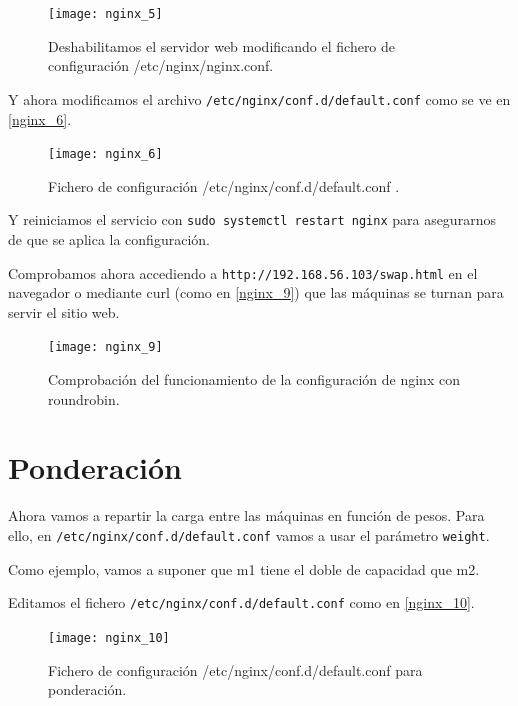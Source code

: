 \begin{figure}[h!]
\begin{center}
\caption{Deshabilitamos el servidor web modificando el fichero de configuración /etc/nginx/nginx.conf.}
\label{nginx_5}
\texttt{[image: nginx\_5]}
\end{center}
\end{figure}

Y ahora modificamos el archivo \verb|/etc/nginx/conf.d/default.conf| como se ve en \eqref{nginx_6}.

\begin{figure}[h!]
\begin{center}
\caption{Fichero de configuración /etc/nginx/conf.d/default.conf .}
\label{nginx_6}
\texttt{[image: nginx\_6]}
\end{center}
\end{figure}

Y reiniciamos el servicio con \verb|sudo systemctl restart nginx| para asegurarnos de que se aplica la configuración.

Comprobamos ahora accediendo a \verb|http://192.168.56.103/swap.html| en el navegador o mediante curl (como en \eqref{nginx_9}) que las máquinas se turnan para servir el sitio web.

\begin{figure}[h!]
\begin{center}
\caption{Comprobación del funcionamiento de la configuración de nginx con roundrobin.}
\label{nginx_9}
\texttt{[image: nginx\_9]}
\end{center}
\end{figure}

\section{Ponderación}

Ahora vamos a repartir la carga entre las máquinas en función de pesos. Para ello, en \verb|/etc/nginx/conf.d/default.conf| vamos a usar el parámetro \verb|weight|.

Como ejemplo, vamos a suponer que m1 tiene el doble de capacidad que m2.

Editamos el fichero \verb|/etc/nginx/conf.d/default.conf| como en \eqref{nginx_10}.

\begin{figure}[h!]
\begin{center}
\caption{Fichero de configuración /etc/nginx/conf.d/default.conf para ponderación.}
\label{nginx_10}
\texttt{[image: nginx\_10]}
\end{center}
\end{figure}

